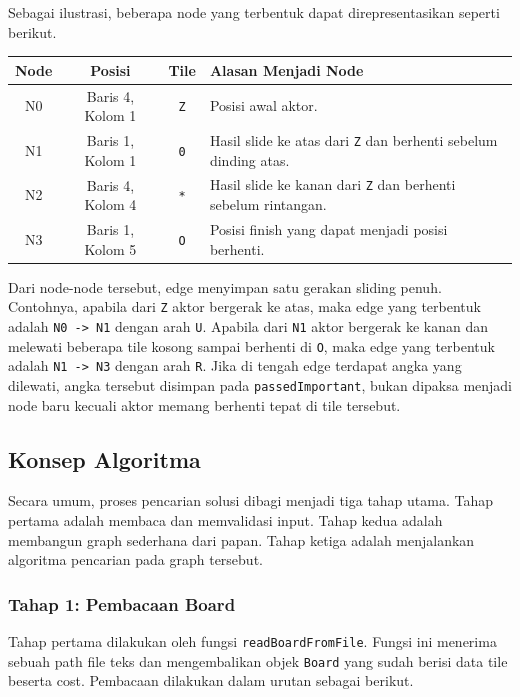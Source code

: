 \documentclass[a4paper,11pt]{article}
\begin{document}
Sebagai ilustrasi, beberapa node yang terbentuk dapat direpresentasikan seperti berikut.

\begin{longtable}{|c|c|c|p{6cm}|}
    \hline
    \textbf{Node} & \textbf{Posisi} & \textbf{Tile} & \textbf{Alasan Menjadi Node} \\
    \hline
    \endhead
    N0 & Baris 4, Kolom 1 & \texttt{Z} & Posisi awal aktor. \\
    \hline
    N1 & Baris 1, Kolom 1 & \texttt{0} & Hasil slide ke atas dari \texttt{Z} dan berhenti sebelum dinding atas. \\
    \hline
    N2 & Baris 4, Kolom 4 & \texttt{*} & Hasil slide ke kanan dari \texttt{Z} dan berhenti sebelum rintangan. \\
    \hline
    N3 & Baris 1, Kolom 5 & \texttt{O} & Posisi finish yang dapat menjadi posisi berhenti. \\
    \hline
\end{longtable}

Dari node-node tersebut, edge menyimpan satu gerakan sliding penuh. Contohnya, apabila dari \texttt{Z} aktor bergerak ke atas, maka edge yang terbentuk adalah \texttt{N0 -> N1} dengan arah \texttt{U}. Apabila dari \texttt{N1} aktor bergerak ke kanan dan melewati beberapa tile kosong sampai berhenti di \texttt{O}, maka edge yang terbentuk adalah \texttt{N1 -> N3} dengan arah \texttt{R}. Jika di tengah edge terdapat angka yang dilewati, angka tersebut disimpan pada \texttt{passedImportant}, bukan dipaksa menjadi node baru kecuali aktor memang berhenti tepat di tile tersebut.

\subsection{Konsep Algoritma}
Secara umum, proses pencarian solusi dibagi menjadi tiga tahap utama. Tahap pertama adalah membaca dan memvalidasi input. Tahap kedua adalah membangun graph sederhana dari papan. Tahap ketiga adalah menjalankan algoritma pencarian pada graph tersebut.

\subsubsection{Tahap 1: Pembacaan Board}
Tahap pertama dilakukan oleh fungsi \texttt{readBoardFromFile}. Fungsi ini menerima sebuah path file teks dan mengembalikan objek \texttt{Board} yang sudah berisi data tile beserta cost. Pembacaan dilakukan dalam urutan sebagai berikut.
\end{document}
